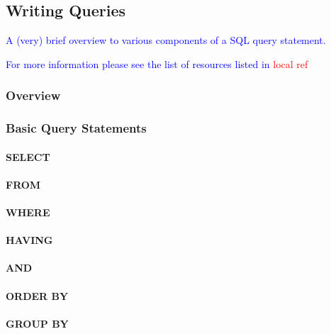 \subsection{Writing Queries}

\textcolor{blue}{A (very) brief overview to various components of a SQL query statement.}

\textcolor{blue}{For more information please see the list of resources listed in \textcolor{red}{local ref}}

\subsubsection{Overview}



\subsubsection{Basic Query Statements}

\paragraph{SELECT}

\paragraph{FROM}

\paragraph{WHERE}

\paragraph{HAVING}

\paragraph{AND}

\paragraph{ORDER BY}

\paragraph{GROUP BY}

